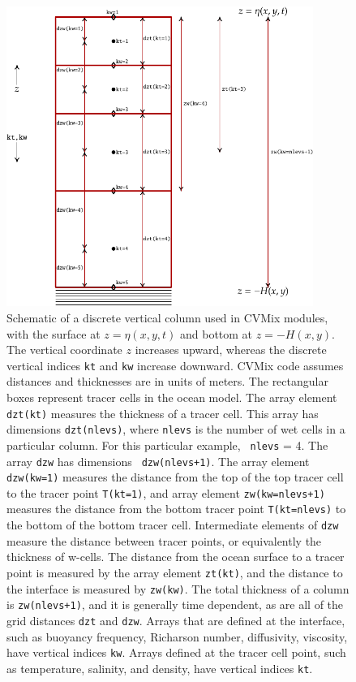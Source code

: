 \begin{figure}[h!t]
\begin{center}
\includegraphics[angle=0,width=10cm]{./mfpic_figs/cvmix_discrete_vertical.pdf}
\caption[Discrete vertical column for CVMix modules]{\sf Schematic of
  a discrete vertical column used in CVMix modules, with the surface
  at $z=\eta(x,y,t)$ and bottom at $z=-H(x,y)$.  The vertical
  coordinate $z$ increases upward, whereas the discrete vertical
  indices {\tt kt} and {\tt kw} increase downward.  CVMix code assumes
  distances and thicknesses are in units of meters. The rectangular
  boxes represent tracer cells in the ocean model.  The array element
  {\tt dzt(kt)} measures the thickness of a tracer cell. This array
  has dimensions {\tt dzt(nlevs)}, where {\tt nlevs} is the number of
  wet cells in a particular column.  For this particular example, {\tt
    nlevs} = 4.  The array {\tt dzw} has dimensions {\tt
    dzw(nlevs+1)}.  The array element {\tt dzw(kw=1)} measures the
  distance from the top of the top tracer cell to the tracer point
  {\tt T(kt=1)}, and array element {\tt zw(kw=nlevs+1)} measures the
  distance from the bottom tracer point {\tt T(kt=nlevs)} to the bottom
  of the bottom tracer cell.  Intermediate elements of {\tt dzw}
  measure the distance between tracer points, or equivalently the
  thickness of w-cells.  The distance from the ocean surface to a
  tracer point is measured by the array element {\tt zt(kt)}, and the
  distance to the interface is measured by {\tt zw(kw)}.  The total
  thickness of a column is {\tt zw(nlevs+1)}, and it is generally time
  dependent, as are all of the grid distances {\tt dzt} and {\tt dzw}.
  Arrays that are defined at the interface, such as buoyancy
  frequency, Richarson number, diffusivity, viscosity, have vertical
  indices {\tt kw}.  Arrays defined at the tracer cell point, such as
  temperature, salinity, and density, have vertical indices {\tt kt}.}
\label{fig:cvmix_discrete_vertical}
\end{center}
\end{figure}


